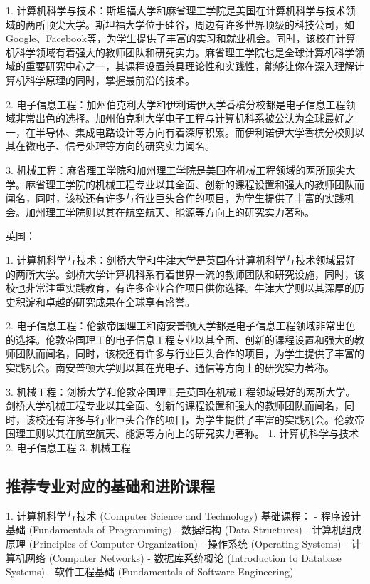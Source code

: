 \documentclass[12pt]{article}
\begin{document}
\begin{CJK*}{UTF8}{gbsn}
1. 计算机科学与技术：斯坦福大学和麻省理工学院是美国在计算机科学与技术领域的两所顶尖大学。斯坦福大学位于硅谷，周边有许多世界顶级的科技公司，如Google、Facebook等，为学生提供了丰富的实习和就业机会。同时，该校在计算机科学领域有着强大的教师团队和研究实力。麻省理工学院也是全球计算机科学领域的重要研究中心之一，其课程设置兼具理论性和实践性，能够让你在深入理解计算机科学原理的同时，掌握最前沿的技术。

2. 电子信息工程：加州伯克利大学和伊利诺伊大学香槟分校都是电子信息工程领域非常出色的选择。加州伯克利大学电子工程与计算机科系被公认为全球最好之一，在半导体、集成电路设计等方向有着深厚积累。而伊利诺伊大学香槟分校则以其在微电子、信号处理等方向的研究实力闻名。

3. 机械工程：麻省理工学院和加州理工学院是美国在机械工程领域的两所顶尖大学。麻省理工学院的机械工程专业以其全面、创新的课程设置和强大的教师团队而闻名，同时，该校还有许多与行业巨头合作的项目，为学生提供了丰富的实践机会。加州理工学院则以其在航空航天、能源等方向上的研究实力著称。

英国：

1. 计算机科学与技术：剑桥大学和牛津大学是英国在计算机科学与技术领域最好的两所大学。剑桥大学计算机科系有着世界一流的教师团队和研究设施，同时，该校也非常注重实践教育，有许多企业合作项目供你选择。牛津大学则以其深厚的历史积淀和卓越的研究成果在全球享有盛誉。

2. 电子信息工程：伦敦帝国理工和南安普顿大学都是电子信息工程领域非常出色的选择。伦敦帝国理工的电子信息工程专业以其全面、创新的课程设置和强大的教师团队而闻名，同时，该校还有许多与行业巨头合作的项目，为学生提供了丰富的实践机会。南安普顿大学则以其在光电子、通信等方向上的研究实力著称。

3. 机械工程：剑桥大学和伦敦帝国理工是英国在机械工程领域最好的两所大学。剑桥大学机械工程专业以其全面、创新的课程设置和强大的教师团队而闻名，同时，该校还有许多与行业巨头合作的项目，为学生提供了丰富的实践机会。伦敦帝国理工则以其在航空航天、能源等方向上的研究实力著称。
   1. 计算机科学与技术
2. 电子信息工程
3. 机械工程


   \newpage
   \subsection*{推荐专业对应的基础和进阶课程}
   1. 计算机科学与技术 (Computer Science and Technology)
   基础课程：
   - 程序设计基础 (Fundamentals of Programming)
   - 数据结构 (Data Structures)
   - 计算机组成原理 (Principles of Computer Organization)
   - 操作系统 (Operating Systems)
   - 计算机网络 (Computer Networks)
   - 数据库系统概论 (Introduction to Database Systems)
   - 软件工程基础 (Fundamentals of Software Engineering)


\end{CJK*}
\end{document}
